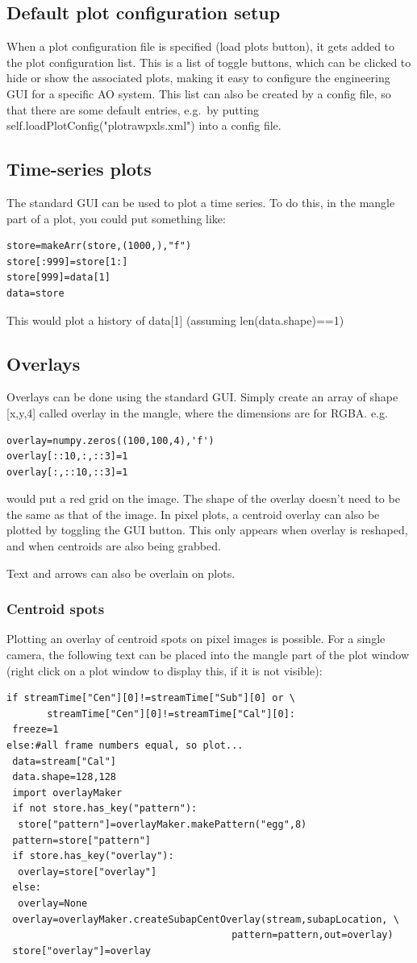 \documentclass[a4,10pt]{article}
\begin{document}
\subsection{Default plot configuration setup}
When a plot configuration file is specified (load plots button), it
gets added to the plot configuration list.  This is a list of toggle
buttons, which can be clicked to hide or show the associated plots,
making it easy to configure the engineering GUI for a specific AO system.
This list can also be created by a config file, so that there are some
default entries, e.g.\ by putting
self.loadPlotConfig("plotrawpxls.xml") into a config file.

\subsection{Time-series plots}
The standard GUI can be used to plot a time series.
To do this, in the mangle part of a plot, you could put something
like:
\begin{verbatim}
store=makeArr(store,(1000,),"f")
store[:999]=store[1:]
store[999]=data[1]
data=store
\end{verbatim}
This would plot a history of data[1] (assuming len(data.shape)==1)

\subsection{Overlays}
Overlays can be done using the standard GUI.
Simply create an array of shape [x,y,4] called overlay in the mangle,
where the dimensions are for RGBA.  
e.g.
\begin{verbatim}
overlay=numpy.zeros((100,100,4),'f')
overlay[::10,:,::3]=1
overlay[:,::10,::3]=1
\end{verbatim}
would put a red grid on the image.  The shape of the overlay doesn't
need to be the same as that of the image.
In pixel plots, a centroid overlay can also be plotted by toggling the
GUI button.  This only appears when overlay is reshaped, and when
centroids are also being grabbed.

Text and arrows can also be overlain on plots.

\subsubsection{Centroid spots}
Plotting an overlay of centroid spots on pixel images is possible.
For a single camera, the following text can be placed into the mangle
part of the plot window (right click on a plot window to display this,
if it is not visible):
\begin{verbatim}
if streamTime["Cen"][0]!=streamTime["Sub"][0] or \
       streamTime["Cen"][0]!=streamTime["Cal"][0]:
 freeze=1
else:#all frame numbers equal, so plot...
 data=stream["Cal"]
 data.shape=128,128
 import overlayMaker
 if not store.has_key("pattern"):
  store["pattern"]=overlayMaker.makePattern("egg",8)
 pattern=store["pattern"]
 if store.has_key("overlay"):
  overlay=store["overlay"]
 else:
  overlay=None
 overlay=overlayMaker.createSubapCentOverlay(stream,subapLocation, \
                                       pattern=pattern,out=overlay)
 store["overlay"]=overlay
\end{verbatim}
\end{document}
